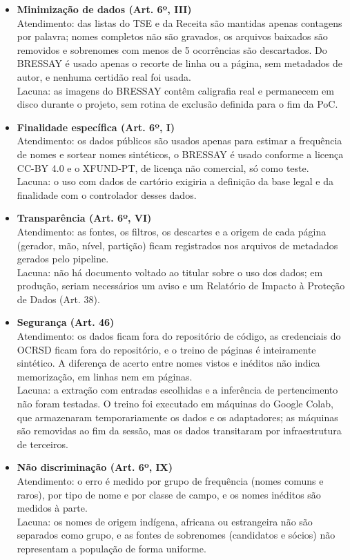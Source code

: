 \documentclass[12pt,a4paper]{article}
\begin{document}
\begin{itemize}
    \item \textbf{Minimização de dados (Art. 6º, III)} \\
    Atendimento: das listas do TSE e da Receita são mantidas apenas contagens por palavra; nomes completos não são gravados, os arquivos baixados são removidos e sobrenomes com menos de 5 ocorrências são descartados. Do BRESSAY é usado apenas o recorte de linha ou a página, sem metadados de autor, e nenhuma certidão real foi usada. \\
    Lacuna: as imagens do BRESSAY contêm caligrafia real e permanecem em disco durante o projeto, sem rotina de exclusão definida para o fim da PoC.

    \item \textbf{Finalidade específica (Art. 6º, I)} \\
    Atendimento: os dados públicos são usados apenas para estimar a frequência de nomes e sortear nomes sintéticos, o BRESSAY é usado conforme a licença CC-BY 4.0 e o XFUND-PT, de licença não comercial, só como teste. \\
    Lacuna: o uso com dados de cartório exigiria a definição da base legal e da finalidade com o controlador desses dados.

    \item \textbf{Transparência (Art. 6º, VI)} \\
    Atendimento: as fontes, os filtros, os descartes e a origem de cada página (gerador, mão, nível, partição) ficam registrados nos arquivos de metadados gerados pelo pipeline. \\
    Lacuna: não há documento voltado ao titular sobre o uso dos dados; em produção, seriam necessários um aviso e um Relatório de Impacto à Proteção de Dados (Art. 38).

    \item \textbf{Segurança (Art. 46)} \\
    Atendimento: os dados ficam fora do repositório de código, as credenciais do OCRSD ficam fora do repositório, e o treino de páginas é inteiramente sintético. A diferença de acerto entre nomes vistos e inéditos não indica memorização, em linhas nem em páginas. \\
    Lacuna: a extração com entradas escolhidas e a inferência de pertencimento não foram testadas. O treino foi executado em máquinas do Google Colab, que armazenaram temporariamente os dados e os adaptadores; as máquinas são removidas ao fim da sessão, mas os dados transitaram por infraestrutura de terceiros.

    \item \textbf{Não discriminação (Art. 6º, IX)} \\
    Atendimento: o erro é medido por grupo de frequência (nomes comuns e raros), por tipo de nome e por classe de campo, e os nomes inéditos são medidos à parte. \\
    Lacuna: os nomes de origem indígena, africana ou estrangeira não são separados como grupo, e as fontes de sobrenomes (candidatos e sócios) não representam a população de forma uniforme.
\end{itemize}
\end{document}
